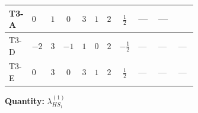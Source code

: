 \documentclass[8pt]{article}
\begin{document}
\begin{landscape}
\begin{longtable}{@{}llcccccc >{\raggedright\arraybackslash}p{0.21\linewidth} >{\raggedright\arraybackslash}p{0.21\linewidth} >{\raggedright\arraybackslash}p{0.21\linewidth}@{}}
\midrule
T3-A & $0$ & $1$ & $0$ & $3$ & $1$ & $2$ & $\frac{1}{2}$ & --- & --- & \scriptsize\adjustbox{max width=\linewidth}{$\begin{gathered} {\lambda_{HS_1}^{(1)}} (4 T_{\nu}^{(1)}+6 \operatorname{Tr}\!\left({Y_d}\,\left({Y_d}\right)^{\dagger}\right)+2 \operatorname{Tr}\!\left({Y_e}\,\left({Y_e}\right)^{\dagger}\right)+6 \operatorname{Tr}\!\left({Y_u}\,\left({Y_u}\right)^{\dagger}\right))\end{gathered}$} \\
\midrule
T3-D & $-2$ & $3$ & $-1$ & $1$ & $0$ & $2$ & $-\frac{1}{2}$ & --- & --- & --- \\
\midrule
T3-E & $0$ & $3$ & $0$ & $3$ & $1$ & $2$ & $\frac{1}{2}$ & --- & --- & --- \\
\midrule
\bottomrule
\end{longtable}
\clearpage
\noindent\textbf{Quantity: }$\lambda_{HS_1}^{(1)}$\par\smallskip

\end{landscape}
\end{document}
